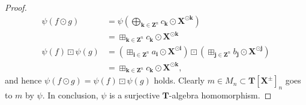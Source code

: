 \documentclass[10pt,a4paper]{amsart}
\begin{document}
\begin{proof}
\begin{align*}
\psi(f \odot g) &= \psi \left( \bigoplus_{\boldsymbol{k} \in \boldsymbol{Z}^n} c_{\boldsymbol{k}} \odot \boldsymbol{X}^{\odot \boldsymbol{k}} \right)\\
&= \boxplus_{\boldsymbol{k} \in \boldsymbol{Z}^n} c_{\boldsymbol{k}} \odot \boldsymbol{X}^{\odot \boldsymbol{k}}\\
\psi(f) \boxdot \psi(g) &= \left( \boxplus_{\boldsymbol{i} \in \boldsymbol{Z}^n} a_{\boldsymbol{i}} \odot \boldsymbol{X}^{\odot \boldsymbol{i}} \right) \boxdot \left( \boxplus_{\boldsymbol{j} \in \boldsymbol{Z}^n} b_{\boldsymbol{j}} \odot \boldsymbol{X}^{\odot \boldsymbol{j}} \right)\\
&= \boxplus_{\boldsymbol{k} \in \boldsymbol{Z}^n} c_{\boldsymbol{k}} \odot \boldsymbol{X}^{\odot \boldsymbol{k}},
\end{align*}
and hence $\psi(f \odot g) = \psi(f) \boxdot \psi(g)$ holds.
Clearly $m \in M_n \subset \boldsymbol{T}[\boldsymbol{X}^{\pm}]_n$ goes to $m$ by $\psi$.
In conclusion, $\psi$ is a surjective $\boldsymbol{T}$-algebra homomorphism.
\end{proof}
\end{document}
